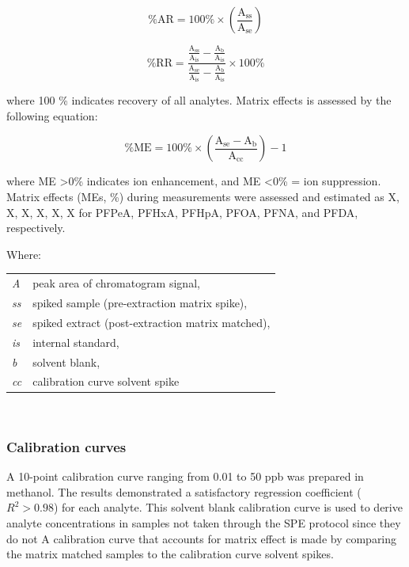 \begin{equation}
    \label{eq:Recovery}
    \mathrm{\% AR  = 100 \% \times \left ( \frac{A_{ss}}{A_{se}} \right ) }
\end{equation}

\begin{equation}
    \label{eq:relativeRecovery}
    \mathrm{\% RR = \frac{\frac{A_{ss}}{A_{is}}-\frac{A_{b}}{A_{is}}}{\frac{A_{se}}{A_{is}}-\frac{A_{b}}{A_{is}}}\times 100 \% }
\end{equation}

where 100 \% indicates recovery of all analytes. Matrix effects is assessed by the following equation:

\begin{equation}
    \label{eq:ME}
    \mathrm{\% ME = 100 \% \times \left(\frac{A_{se} - A_b}{A_{cc}}\right )-1 }
\end{equation}

where ME \textgreater 0\% indicates ion enhancement, and ME \textless 0\% = ion suppression. Matrix effects (MEs, \%) during measurements were assessed and estimated as X, X, X, X, X, X for PFPeA, PFHxA, PFHpA, PFOA, PFNA, and PFDA, respectively.

Where: \newline
\newline
\begin{tabular}{p{1cm}p{20cm}}
    \textit{A}   & peak area of chromatogram signal, \\
    \textit{ss}  & spiked sample (pre-extraction matrix spike), \\
    \textit{se}  & spiked extract (post-extraction matrix matched), \\
    \textit{is}  & internal standard, \\
    \textit{b}   & solvent blank, \\
    \textit{cc}  & calibration curve solvent spike \\
\end{tabular} \\

\subsubsection{Calibration curves}
A 10-point calibration curve ranging from 0.01 to 50 ppb was prepared in methanol. The results demonstrated a satisfactory regression coefficient ($R^2 > 0.98$) for each analyte. This solvent blank calibration curve is used to derive analyte concentrations in samples not taken through the SPE protocol since they do not  A calibration curve that accounts for matrix effect is made by comparing the matrix matched samples to the calibration curve solvent spikes.

